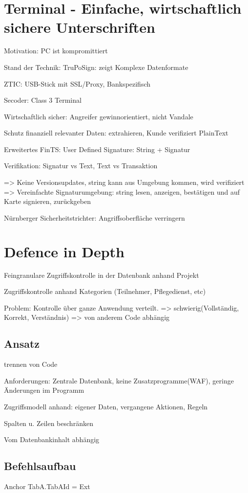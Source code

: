 \section*{Terminal - Einfache, wirtschaftlich sichere Unterschriften}
Motivation: PC ist kompromittiert

Stand der Technik:
TruPoSign: zeigt Komplexe Datenformate

ZTIC: USB-Stick mit SSL/Proxy, Bankspezifisch

Secoder: Class 3 Terminal

Wirtschaftlich sicher: Angreifer gewinnorientiert, nicht Vandale

Schutz finanziell relevanter Daten: extrahieren, Kunde verifiziert PlainText

Erweitertes FinTS: User Defined Signature: String + Signatur

Verifikation: Signatur vs Text, Text vs Transaktion

=> Keine Versionsupdates, string kann aus Umgebung kommen, wird verifiziert
=> Vereinfachte Signaturumgebung: string lesen, anzeigen, bestätigen und auf Karte signieren, zurückgeben

Nürnberger Sicherheitstrichter: Angriffsoberfläche verringern



\section*{Defence in Depth}
Feingranulare Zugriffskontrolle in der Datenbank anhand Projekt

Zugriffskontrolle anhand Kategorien (Teilnehmer, Pflegedienst, etc)

Problem: Kontrolle über ganze Anwendung verteilt.
=> schwierig(Vollständig, Korrekt, Verständnis)
=> von anderem Code abhängig

\subsection*{Ansatz} trennen von Code

Anforderungen: Zentrale Datenbank, keine Zusatzprogramme(WAF), geringe Änderungen im Programm

Zugriffsmodell anhand: eigener Daten, vergangene Aktionen, Regeln

Spalten u. Zeilen beschränken

Vom Datenbankinhalt abhängig



\subsection*{Befehlsaufbau}
Anchor TabA.TabAId = Ext

